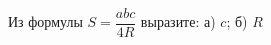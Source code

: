 \begin{ex}[type=]
	\begin{condition}
		Из формулы \( S=\dfrac{abc}{4R} \) выразите: а) \( c \); б) \( R \)
	\end{condition}
\end{ex}